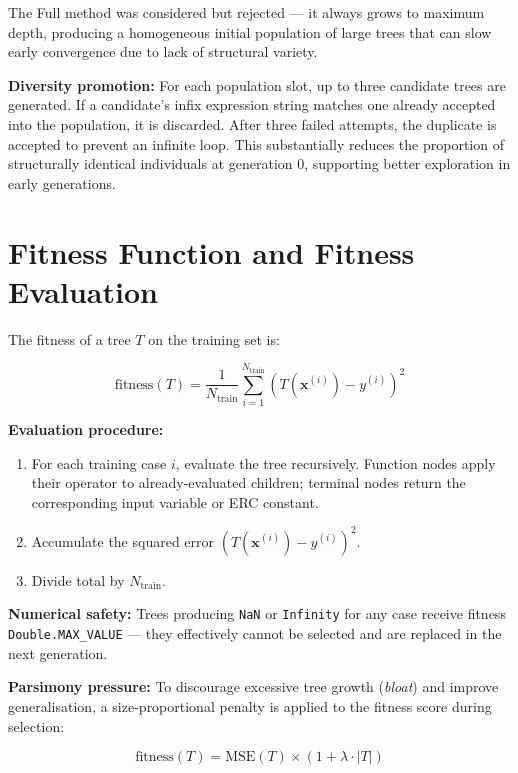 \documentclass[12pt,a4paper]{article}
\begin{document}
The Full method was considered but rejected --- it always grows to maximum depth, producing a homogeneous initial population of large trees that can slow early convergence due to lack of structural variety.

\textbf{Diversity promotion:} For each population slot, up to three candidate trees are generated. If a candidate's infix expression string matches one already accepted into the population, it is discarded. After three failed attempts, the duplicate is accepted to prevent an infinite loop. This substantially reduces the proportion of structurally identical individuals at generation 0, supporting better exploration in early generations.

\section{Fitness Function and Fitness Evaluation}

The fitness of a tree $T$ on the training set is:

\[
\text{fitness}(T) = \frac{1}{N_{\text{train}}} \sum_{i=1}^{N_{\text{train}}} \left( T\!\left(\mathbf{x}^{(i)}\right) - y^{(i)} \right)^2
\]

\textbf{Evaluation procedure:}

\begin{enumerate}
    \item For each training case $i$, evaluate the tree recursively. Function nodes apply their operator to already-evaluated children; terminal nodes return the corresponding input variable or ERC constant.
    \item Accumulate the squared error $\left(T(\mathbf{x}^{(i)}) - y^{(i)}\right)^2$.
    \item Divide total by $N_{\text{train}}$.
\end{enumerate}

\textbf{Numerical safety:} Trees producing \texttt{NaN} or \texttt{Infinity} for any case receive fitness \texttt{Double.MAX\_VALUE} --- they effectively cannot be selected and are replaced in the next generation.

\textbf{Parsimony pressure:} To discourage excessive tree growth (\emph{bloat}) and improve generalisation, a size-proportional penalty is applied to the fitness score during selection:

\[
\text{fitness}(T) = \text{MSE}(T) \times \left(1 + \lambda \cdot |T|\right)
\]
\end{document}
